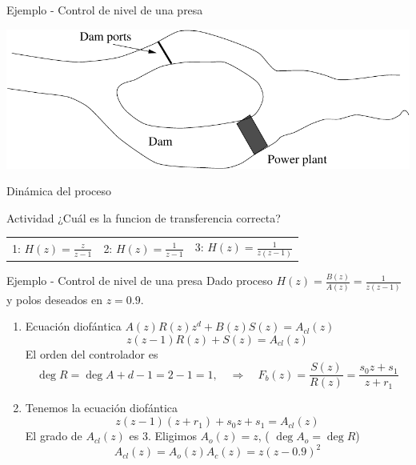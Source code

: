 \documentclass[presentation,aspectratio=169]{beamer}
\begin{document}
\begin{frame}[label={sec:org244005e}]{Ejemplo - Control de nivel de una presa}
\begin{center}
\includegraphics[width=0.5\linewidth]{../../figures/kraftverk}
\end{center}

\alert{Dinámica del proceso}

\begin{center}
\end{center}

\alert{Actividad} ¿Cuál es la funcion de transferencia correcta?

\begin{center}
\begin{tabular}{lll}
1: \(H(z) = \frac{z}{z-1}\) & 2: \(H(z)=\frac{1}{z-1}\) & 3: \(H(z)=\frac{1}{z(z-1)}\)\\
\end{tabular}
\end{center}
\end{frame}

\begin{frame}[label={sec:orgb2f1ba3}]{Ejemplo - Control de nivel de una presa}
Dado proceso \(H(z) = \frac{B(z)}{A(z)} = \frac{1}{z(z-1)}\) y polos deseados en \(z=0.9\).

\begin{enumerate}
\item Ecuación diofántica \(A(z)R(z)z^d + B(z)S(z) = A_{cl}(z)\)
\[ z(z-1)R(z) + S(z) = A_{cl}(z)\]
El orden del controlador es 
\[\deg R = \deg A + d - 1 = 2-1 = 1, \quad \Rightarrow \quad F_b(z)=\frac{S(z)}{R(z)} = \frac{s_0z + s_1}{z + r_1}\]
\item Tenemos la ecuación diofántica
\[ z(z-1)(z+r_1) + s_0z + s_1 = A_{cl}(z)\]
El grado de \(A_{cl}(z)\) es 3. Eligimos \(A_o(z) = z\),  ( \(\deg A_o = \deg R\)) 
\[ A_{cl}(z) = A_o(z) A_c(z) = z(z-0.9)^2\]
\end{enumerate}
\end{frame}
\end{document}

